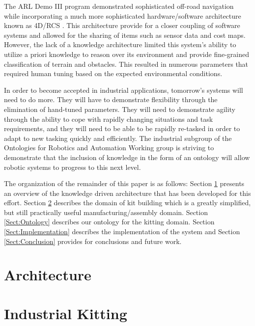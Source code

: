 \documentclass[preprint,12pt]{elsarticle}
\begin{document}
The ARL Demo III program demonstrated sophisticated off-road navigation while incorporating a much more sophisticated 
hardware/software architecture known as 4D/RCS \cite{Albus2000}. This
architecture provide for a closer coupling of software systems and allowed for the sharing of items such as sensor data and cost maps.
However, the lack of a knowledge architecture limited this system\rq{}s ability to utilize a priori knowledge to reason over its environment
and provide fine-grained classification of terrain and obstacles. This resulted in numerous parameters that required human tuning based on 
the expected environmental conditions. 

In order to become accepted in industrial applications, tomorrow\rq{}s systems will need to do more. They will have to demonstrate flexibility through the 
elimination of hand-tuned parameters. They will need to demonstrate agility through the ability to cope with rapidly changing situations and task requirements, 
and they will need to be able to be rapidly re-tasked in order to adapt to new tasking quickly and efficiently. The  industrial subgroup of the 
Ontologies for Robotics and Automation Working group is striving to demonstrate that the inclusion of knowledge in the form of an ontology
will allow robotic systems to progress to this next level.

The organization of the remainder of this paper is as follows: Section \ref{Sect:Architecture} presents an overview of the knowledge driven architecture that
has been developed for this effort. Section \ref{Sect:Kitting} describes the domain of kit building
which is a greatly simplified, but still practically useful manufacturing/assembly domain. Section \ref{Sect:Ontology} describes our ontology for the kitting
domain. Section \ref{Sect:Implementation} describes the implementation of the system and Section \ref{Sect:Conclusion} provides for conclusions and
future work.


\section{Architecture}
\label{Sect:Architecture}


\section{Industrial Kitting}
\label{Sect:Kitting}


\end{document}
